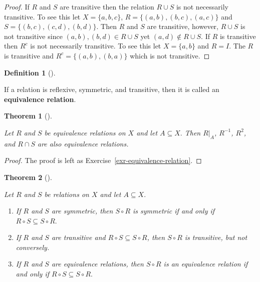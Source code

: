 \documentclass[
  letterpaper,
  10pt,
  reqno,
  twopage,
  openany]{book}
\providecommand{\tightlist}{%
  \setlength{\itemsep}{0pt}\setlength{\parskip}{0pt}}\usepackage{longtable,booktabs,array}
\theoremstyle{plain}
\theoremstyle{definition}
\theoremstyle{definition}
\newtheorem{definition}{Definition}[chapter]
\theoremstyle{definition}
\theoremstyle{plain}
\theoremstyle{plain}
\newtheorem{theorem}{Theorem}[chapter]
\theoremstyle{remark}
\begin{document}
\begin{proof}
If \(R\) and \(S\) are transitive then the relation \(R\cup S\) is not
necessarily transitive. To see this let \(X=\{a,b,c\}\),
\(R=\{(a,b),(b,c),(a,c)\}\) and \(S=\{(b,c),(c,d),(b,d)\}.\) Then \(R\)
and \(S\) are transitive, however, \(R\cup S\) is not transitive since
\((a,b), (b,d)\in R\cup S\) yet \((a,d)\notin R\cup S.\) If \(R\) is
transitive then \(R^c\) is not necessarily transitive. To see this let
\(X=\{a,b\}\) and \(R=I.\) The \(R\) is transitive and
\(R^c=\{(a,b),(b,a)\}\) which is not transitive.

\end{proof}

\leavevmode{}%
\begin{definition}[]\label{def-equivalence-relation}

If a relation is reflexive, symmetric, and transitive, then it is called
an  \textbf{equivalence relation}.

\end{definition}

\leavevmode{}%
\begin{theorem}[]\label{thm-equivalence-relation}

Let \(R\) and \(S\) be equivalence relations on \(X\) and let
\(A\subseteq X.\) Then \(R|_A\), \(R^{-1}\), \(R^2\), and \(R\cap S\)
are also equivalence relations.

\end{theorem}

\begin{proof}

The proof is left as Exercise~\ref{exr-equivalence-relation}.

\end{proof}

\leavevmode{}%
\begin{theorem}[]\label{thm-equivalence-relations-composition}

Let \(R\) and \(S\) be relations on \(X\) and let \(A\subseteq X.\)

\begin{enumerate}
\def\labelenumi{\arabic{enumi}.}
\tightlist
\item
  If \(R\) and \(S\) are symmetric, then \(S\circ R\) is symmetric if
  and only if \(R\circ S\subseteq S\circ R.\)
\item
  If \(R\) and \(S\) are transitive and \(R\circ S\subseteq S\circ R\),
  then \(S\circ R\) is transitive, but not conversely.
\item
  If \(R\) and \(S\) are equivalence relations, then \(S\circ R\) is an
  equivalence relation if and only if \(R\circ S\subseteq S\circ R.\)
\end{enumerate}

\end{theorem}
\end{document}
